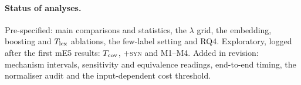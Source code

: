 \paragraph{Status of analyses.}
Pre-specified: main comparisons and statistics, the $\lambda$ grid, the embedding, boosting and $T_{\rm lex}$ ablations, the few-label setting and RQ4. Exploratory, logged after the first mE5 results: $T_{\rm cov}$, \textsc{+syn} and M1--M4. Added in revision: mechanism intervals, sensitivity and equivalence readings, end-to-end timing, the normaliser audit and the input-dependent cost threshold.
